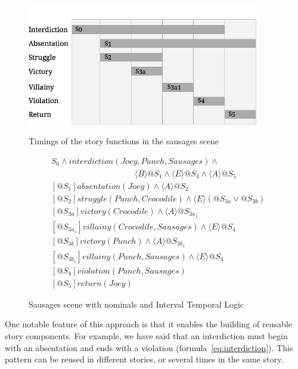 \documentclass[11pt]{report}
\begin{document}
\begin{figure}[!t]
  \centering
    \centerline{\includegraphics[width=0.9\textwidth]{durations.png}}
  \caption{Timings of the story functions in the sausages scene}\label{fig:durations}
\begin{align}
  &S_{0} \land \mathit{interdiction(Joey, Punch, Sausages)} \land\nonumber\\
  &\qquad\qquad\qquad\qquad\qquad\langle B \rangle @S_{1} \land \langle E \rangle @S_{4} \land \langle A \rangle @S_{5}\label{eq:interdiction}\\
  &[@S_{1}] \mathit{absentation(Joey)} \land \langle A \rangle @S_{2}\label{eq:absentation-pj}\\
  &[@S_{2}] \mathit{struggle(Punch, Crocodile)} \land \langle E \rangle (@S_{3a} \lor @S_{3b})\label{eq:struggle}\\
  &[@S_{3a}] \mathit{victory(Crocodile)} \land \langle A \rangle @S_{3a_1}\\
  &[@S_{3a_1}] \mathit{villainy(Crocodile, Sausages)} \land \langle E \rangle @S_{4}\\
  &[@S_{3b}] \mathit{victory(Punch)} \land \langle A \rangle @S_{3b_1}\\
  &[@S_{3b_1}] \mathit{villainy(Punch, Sausages)} \land \langle E \rangle @S_{4}\\
  &[@S_{4}] \mathit{violation(Punch, Sausages)}\\
  &[@S_{5}] \mathit{return(Joey)}
\end{align}
\caption{Sausages scene with nominals and Interval Temporal Logic}\label{fig:situations}
\end{figure}

One notable feature of this approach is that it enables the building of reusable story components. For example, we have said that an interdiction must begin with an absentation and ends with a violation (formula~\ref{eq:interdiction}). This pattern can be reused in different stories, or several times in the same story.
\end{document}
